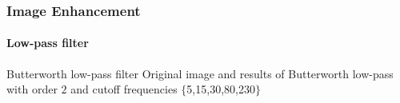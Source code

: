 \documentclass{beamer}
\begin{document}
\begin{frame}
\frametitle{Image Enhancement}
\framesubtitle{Low-pass filter}
\begin{block}{Butterworth low-pass filter}
\scriptsize{Original image and results of Butterworth low-pass with order $2$ and cutoff frequencies $\{$5,15,30,80,230$\}$}\\
\end{block}
\end{frame}
\end{document}
